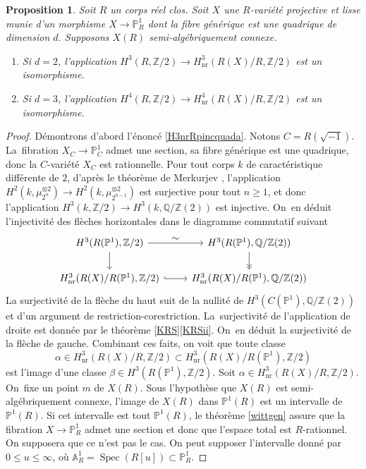 \documentclass[11pt]{article}
\let\ts\textstyle
\newenvironment{enumeratea}
{\bgroup\def\theenumi{\alph{enumi}}\begin{enumerate}}
{\end{enumerate}\egroup}
\newtheorem{prop}[thm]{Proposition}
\theoremstyle{definition}
\newcommand{\Q}{\mathbb Q}
\newcommand{\Z}{\mathbb Z}
\newcommand{\A}{\mathbb A}
\renewcommand{\P}{\mathbb P}
\newcommand{\Spec}{\operatorname{Spec}}
\newcommand{\on}[1]{\operatorname{#1}}
\begin{document}
\begin{prop}\label{H3nrRpincquad}
Soit $R$ un corps réel clos.
Soit $X$ une $R$-variété projective et lisse munie d'un
morphisme $X \to \P^1_{R}$ dont la fibre générique est une quadrique de dimension $d$. Supposons $X(R)$ semi-algébriquement connexe.
\begin{enumeratea}
\item\label{H3nrRpincquada}
Si $d=2$, l'application $H^3(R,\Z/2) \to H^3_{\on{nr}}(R(X)/R,\Z/2)$ est un isomorphisme.

\item\label{H3nrRpincquadb}
Si $d=3$, l'application
$H^4(R,\Z/2) \to H^4_{\on{nr}}(R(X)/R,\Z/2)$
est un isomorphisme.
\end{enumeratea}
\end{prop}

\begin{proof}
Démontrons d'abord l'énoncé \eqref{H3nrRpincquada}.
Notons $C=R(\sqrt{-1})$. La~fibration $X_{C} \to \P^1_{C}$ admet une section, sa fibre générique est une quadrique, donc la $C$-variété $X_{C}$ est rationnelle. Pour tout corps $k$ de caractéristique différente de $2$, d'après le théorème de Merkurjev \cite{merkurjev1981norm}, l'application $H^2(k,\mu_{2^n}^{\otimes 2})\to H^2(k,\mu_{2^{n-1}}^{\otimes 2})$ est surjective pour tout $n\geq 1$, et donc l'application $H^3(k,\Z/2) \to H^3(k,\Q/\Z(2))$ est injective. On~en déduit l'injectivité des flèches horizontales dans le diagramme commutatif suivant
\[
\begin{tikzcd}
H^3(R(\P^1),\Z/2) \arrow[r,"\ts \sim"] \arrow[d] & H^3(R(\P^1),\Q/\Z(2)) \arrow[d,->>] \\
H^3_{\on{nr}}(R(X)/R(\P^1),\Z/2) \arrow[r,hook] & H^3_{\on{nr}}(R(X)/R(\P^1),\Q/\Z(2))
\end{tikzcd}
\]
La surjectivité de la flèche du haut suit de la nullité de $H^3(C(\P^1),\Q/\Z(2))$ et d'un argument de restriction-corestriction. La~surjectivité de l'application de droite
est donnée par le théorème \ref{KRS}\eqref{KRSii}. On~en déduit la surjectivité de la flèche de gauche. Combinant ces faits, on voit que toute classe \[
\alpha \in
H^3_{\on{nr}}(R(X)/R,\Z/2) \subset H^3_{\on{nr}}(R(X)/R(\P^1),\Z/2)
\] est l'image d'une classe $\beta \in
H^3(R(\P^1), \Z/2)$.
Soit $\alpha \in H^3_{\on{nr}}(R(X)/R,\Z/2)$. On~fixe un point $m$ de $X(R)$. Sous l'hypothèse que $X(R)$ est semi-algébriquement connexe,
l'image de $X(R)$ dans $\P^1(R)$ est un intervalle de $\P^1(R)$.
Si cet intervalle est tout $\P^1(R)$, le théorème \ref{wittgen} assure que la fibration $X \to \P^1_{R}$ admet une section
et donc que l'espace total est $R$-rationnel. On
supposera que ce n'est pas le cas.
On peut supposer l'intervalle donné par $0 \leq u \leq \infty$,
où $\A^1_{R}=\Spec(R[u]) \subset \P^1_{R}$.


\end{proof}
\end{document}
